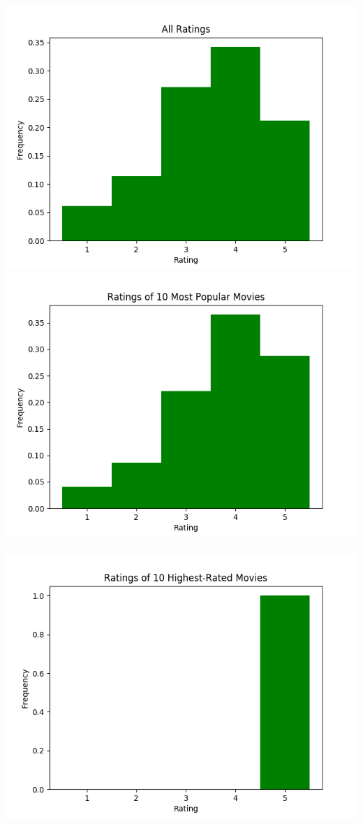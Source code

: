 \includegraphics[scale=0.5]{"All Ratings"}
\includegraphics[scale=0.5]{"Ratings of 10 Most Popular Movies"} \\ \\
\includegraphics[scale=0.5]{"Ratings of 10 Highest-Rated Movies"}
